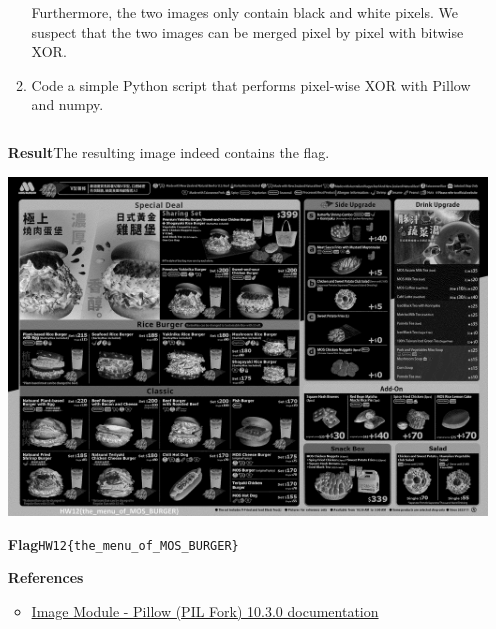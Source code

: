 \documentclass[12pt, a4paper]{article}
\begin{document}
\begin{enumerate}[label=(\alph*)]
\begin{enumerate}[label=(\arabic*)]
      Furthermore, the two images only contain black and white pixels. We suspect
      that the two images can be merged pixel by pixel with bitwise XOR.

      \item Code a simple Python script that performs pixel-wise XOR
      with Pillow and numpy.
      \inputminted[fontsize=\small]{python}{1-e/xor_image.py}
    \end{enumerate}

    \textbf{Result}\quad The resulting image indeed contains the flag.

    \includegraphics[width=0.7\linewidth]{1-e/xor.png}

    \vspace{0.5\baselineskip}
    \textbf{Flag}\quad\verb|HW12{the_menu_of_MOS_BURGER}|

    \vspace{0.5\baselineskip}
    \textbf{References}
    \begin{itemize}
      \item \href{https://pillow.readthedocs.io/en/stable/reference/Image.html}{Image Module - Pillow (PIL Fork) 10.3.0 documentation}
    \end{itemize}
  \end{enumerate}

  \pagebreak
\end{document}

